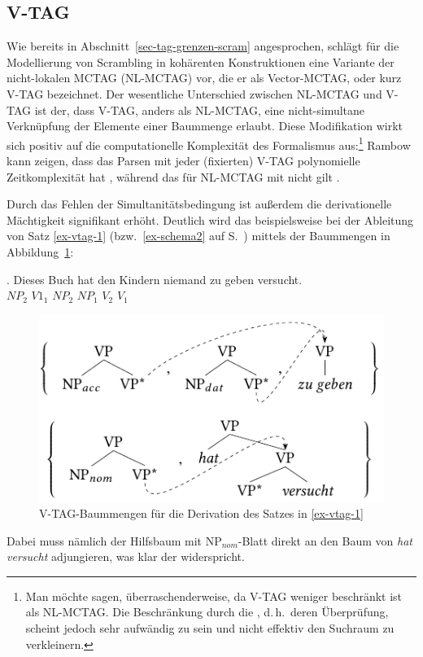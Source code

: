 \subsection{V-TAG} \label{sec-tag-varianten-vtag}

Wie bereits in Abschnitt~\ref{sec-tag-grenzen-scram} angesprochen, schlägt \cite{Rambow:94} für die Modellierung von Scrambling in kohärenten Konstruktionen eine Variante der nicht-lokalen MCTAG (NL-MCTAG) vor, die er als Vector-MCTAG, oder kurz V-TAG bezeichnet. Der wesentliche Unterschied zwischen NL-MCTAG und V-TAG ist der, dass V-TAG, anders als NL-MCTAG, eine nicht-simultane Verknüpfung der Elemente einer Baummenge erlaubt. Diese Modifikation wirkt sich positiv auf die computationelle Komplexität des Formalismus aus:\footnote{Man möchte sagen, überraschenderweise, da V-TAG weniger beschränkt ist als NL-MCTAG. Die Beschränkung durch die , d.\,h.\ deren Überprüfung, scheint jedoch sehr aufwändig zu sein und nicht effektiv den Suchraum zu verkleinern.} Rambow kann zeigen, dass das Parsen mit jeder (fixierten) V-TAG polynomielle Zeitkomplexität hat \citep[120ff]{Rambow:94}, während das für NL-MCTAG mit  nicht gilt \citep{Rambow:Satta:92,Champollion:11a}. 

Durch das Fehlen der Simultanitätsbedingung ist au\ss erdem die derivationelle Mächtigkeit signifikant erhöht. Deutlich wird das beispielsweise bei der Ableitung von Satz \ref{ex-vtag-1} (bzw.\ \ref{ex-schema2} auf S.~\pageref{ex-schema2}) mittels der Baummengen in Abbildung~\ref{fig-vtag-1}:

\exg. {Dieses Buch} hat {den Kindern} niemand {zu geben} versucht.  \\
$\mathit{NP}_2$ $V1_1$ $\mathit{NP}_2$ $\mathit{NP}_1$ $V_2$ $V_1$ \\
\citep[42]{Rambow:94} \label{ex-vtag-1}

\begin{figure}[t]
\centering
\includegraphics{graphics/abb66.pdf}
\caption{V-TAG-Baummengen für die Derivation des Satzes in \ref{ex-vtag-1}\label{fig-vtag-1}}
\end{figure}
Dabei muss nämlich der Hilfsbaum mit NP$_{nom}$-Blatt direkt an den Baum von {\it hat versucht} adjungieren, was klar der  widerspricht.

